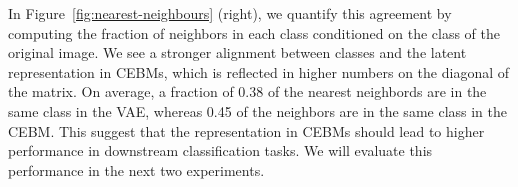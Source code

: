 \documentclass{article}
\begin{document}
In Figure~\ref{fig:nearest-neighbours} (right), we quantify this agreement by computing the fraction of neighbors in each class conditioned on the class of the original image. We see a stronger alignment between classes and the latent representation in CEBMs, which is reflected in higher numbers on the diagonal of the matrix. On average, a fraction of 0.38 of the nearest neighbords are in the same class in the VAE, whereas 0.45 of the neighbors are in the same class in the CEBM. This suggest that the representation in CEBMs should lead to higher performance in downstream classification tasks. We will evaluate this performance in the next two experiments.

\end{document}
